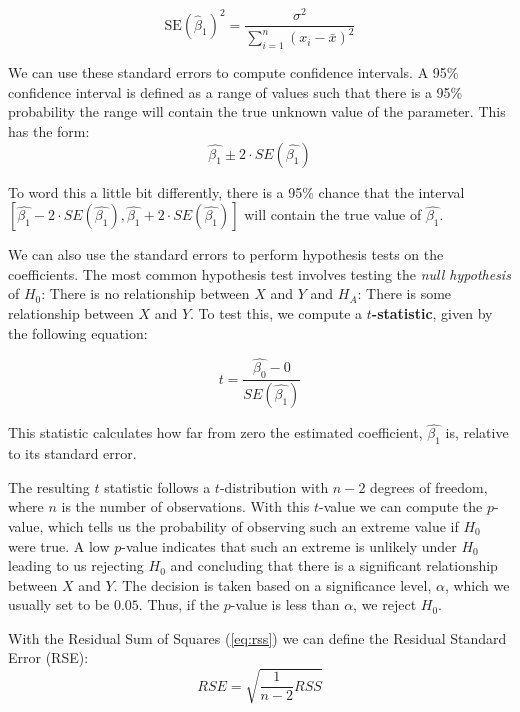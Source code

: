 \begin{equation}
	\text{SE}(\hat{\beta}_1)^2 = \frac{\sigma^2}{\sum_{i=1}^{n} (x_i - \bar{x})^2}
\end{equation}

We can use these standard errors to compute confidence intervals. A 95\% confidence interval is defined as a range of values such that there is a 95\% probability the range will contain the true unknown value of the parameter. This has the form:
\begin{equation}
	\hat{\beta_{1}} \pm 2 \cdot SE(\hat{\beta_{1}})
\end{equation}

To word this a little bit differently, there is a 95\% chance that the interval $[\hat{\beta_{1}} - 2 \cdot SE(\hat{\beta_{1}}), \hat{\beta_{1}} + 2 \cdot SE(\hat{\beta_{1}})]$ will contain the true value  of $\hat{\beta_{1}}$.

We can also use the standard errors to perform hypothesis tests on the coefficients. The most common hypothesis test involves testing the \textit{null hypothesis} of $H_{0}$: There is no relationship between $X$ and $Y$ and $H_{A}$: There is some relationship between $X$ and $Y$. To test this, we compute a \textbf{$t$-statistic}, given by the following equation:

\begin{equation}
	t = \frac{\hat{\beta_{0}}-0}{SE(\hat{\beta_{1}})}
\end{equation}

This statistic calculates how far from zero the estimated coefficient, \(\hat{\beta_{1}}\) is, relative to its standard error.

The resulting $t$ statistic follows a $t$-distribution with $n-2$ degrees of freedom, where $n$ is the number of observations. With this $t$-value we can compute the $p$-value, which tells us the probability of observing such an extreme value if $H_{0}$ were true. A low $p$-value indicates that such an extreme is unlikely under $H_{0}$ leading to us rejecting $H_{0}$ and concluding that there is a significant relationship between $X$ and $Y$. The decision is taken based on a significance level, \(\alpha\), which we usually set to be $0.05$. Thus, if the $p$-value is less than \(\alpha\), we reject $H_{0}$.

With the Residual Sum of Squares (\autoref{eq:rss}) we can define the Residual Standard Error (RSE):
\begin{equation}
	RSE = \sqrt{\frac{1}{n-2}RSS}
\end{equation}

